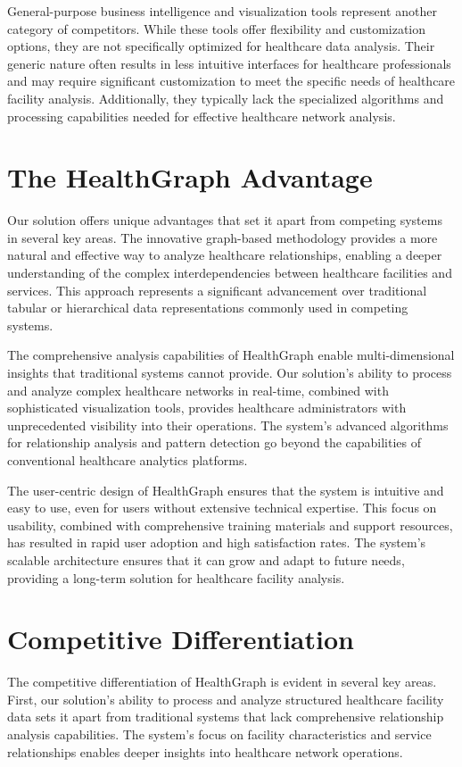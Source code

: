 \documentclass[12pt,a4paper]{report}
\begin{document}
General-purpose business intelligence and visualization tools represent another category of competitors. While these tools offer flexibility and customization options, they are not specifically optimized for healthcare data analysis. Their generic nature often results in less intuitive interfaces for healthcare professionals and may require significant customization to meet the specific needs of healthcare facility analysis. Additionally, they typically lack the specialized algorithms and processing capabilities needed for effective healthcare network analysis.

\section{The HealthGraph Advantage}
Our solution offers unique advantages that set it apart from competing systems in several key areas. The innovative graph-based methodology provides a more natural and effective way to analyze healthcare relationships, enabling a deeper understanding of the complex interdependencies between healthcare facilities and services. This approach represents a significant advancement over traditional tabular or hierarchical data representations commonly used in competing systems.

The comprehensive analysis capabilities of HealthGraph enable multi-dimensional insights that traditional systems cannot provide. Our solution's ability to process and analyze complex healthcare networks in real-time, combined with sophisticated visualization tools, provides healthcare administrators with unprecedented visibility into their operations. The system's advanced algorithms for relationship analysis and pattern detection go beyond the capabilities of conventional healthcare analytics platforms.

The user-centric design of HealthGraph ensures that the system is intuitive and easy to use, even for users without extensive technical expertise. This focus on usability, combined with comprehensive training materials and support resources, has resulted in rapid user adoption and high satisfaction rates. The system's scalable architecture ensures that it can grow and adapt to future needs, providing a long-term solution for healthcare facility analysis.

\section{Competitive Differentiation}
The competitive differentiation of HealthGraph is evident in several key areas. First, our solution's ability to process and analyze structured healthcare facility data sets it apart from traditional systems that lack comprehensive relationship analysis capabilities. The system's focus on facility characteristics and service relationships enables deeper insights into healthcare network operations.
\end{document}
